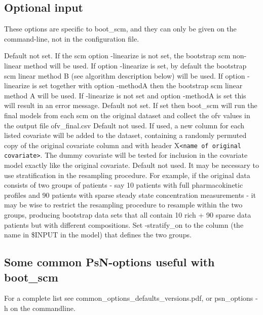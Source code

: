 \subsection{Optional input}
These options are specific to boot\_scm, and they can only be given on the command-line, not in the configuration file.
\begin{optionlist}
Default not set. If the scm option -linearize is not set, the bootstrap scm non-linear method will be used. If option -linearize is set, by default the bootstrap scm linear method B (see algorithm description below) will be used. If option -linearize is set  together with option -methodA then the bootstrap scm linear method A will be used. If -linearize is not set and option -methodA is set this will result in an error message.  
\nextopt
{}
Default not set. If set then boot\_scm will run the final models from each scm on the original dataset and collect the ofv values in the output file ofv\_final.csv   
\nextopt
{}
Default not used. If used, a new column for each listed covariate will be added to the dataset, containing a randomly permuted copy of the original covariate column and with header X\verb|<name of original covariate>|. The dummy covariate will be tested for inclusion in the covariate model exactly like the original covariate. 
\nextopt
{}
Default not used. It may be necessary to use stratification in the resampling procedure. For example, if the original data consists of two groups of patients - say 10 patients with full pharmacokinetic profiles and 90 patients with sparse steady state concentration measurements - it may be wise to restrict the resampling procedure to resample within the two groups, producing bootstrap data sets that all contain 10 rich + 90 sparse data patients but with different compositions. 
Set -stratify\_on to the column (the name in \$INPUT in the model) that defines the two groups.
\nextopt
\end{optionlist}


\subsection{Some common PsN-options useful with boot\_scm}

For a complete list see common\_options\_defaults\_versions.pdf, or psn\_options -h on the commandline.

